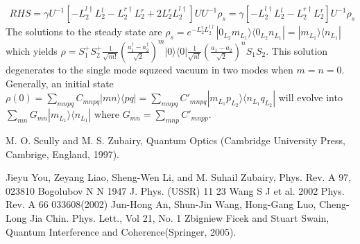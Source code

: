 \documentclass[aps,showpacs,onecolumn,twoside,groupedaddress]{revtex4}
\begin{document}
\begin{equation}
\label{eq18}
\begin{split}
RHS=\gamma U^{-1}[-L_2^{l\dagger}L_2^{l}-L_2^{r\dagger}L_2^{r}+2L_2^{r}L_2^{l\dagger}]UU^{-1}\rho_{s}=\gamma[-L_2^{l\dagger}L_2^{l}-L_2^{r\dagger}L_2^{r}]U^{-1}\rho_{s}
\end{split}
\end{equation}
The solutions to the steady state are $\rho_{s}=e^{-L_{2}^{r}L_{2}^{l\dagger}}|0_{L_{2}}m_{L_{1}}\rangle\langle0_{L_{2}}n_{L_{1}}|=|m_{L_{1}}\rangle\langle n_{L_{1}}|$ which yields $\rho=S_{1}^{+}S_{2}^{+}\frac{1}{\sqrt{m!}}(\frac{a_{1}^{\dagger}-a_{2}^{\dagger}}{\sqrt{2}})^{m}|0\rangle\langle0|\frac{1}{\sqrt{n!}}(\frac{a_{1}-a_{2}}{\sqrt{2}})^{n}S_{1}S_{2}$. This solution degenerates to the single mode squzeed vacuum in two modes when $m=n=0$. Generally, an initial state $\rho(0)=\sum_{mnpq}C_{mnpq}|mn\rangle\langle pq|=\sum_{mnpq}C'_{mnpq}|m_{L_{1}}p_{L_{2}}\rangle\langle n_{L_{1}}q_{L_{2}}|$ will evolve into $\sum_{mn}G_{mn}|m_{L_{1}}\rangle\langle n_{L_{1}}|$ where $G_{mn}=\sum_{mnp}C'_{mnpp}$.





\begin{thebibliography}{99}
 M. O. Scully and M. S. Zubairy, Quantum Optics (Cambridge University Press, Cambrige, England, 1997).

 Jieyu You, Zeyang Liao, Sheng-Wen Li, and M. Suhail Zubairy, Phys. Rev. A 97, 023810 
 Bogolubov N N 1947 J. Phys. (USSR) 11 23
 Wang S J et al. 2002 Phys. Rev. A 66 033608(2002)
 Jun-Hong An, Shun-Jin Wang, Hong-Gang Luo, Cheng-Long Jia Chin. Phys. Lett., Vol 21, No. 1
 Zbigniew Ficek and Stuart Swain, Quantum Interference
and Coherence(Springer, 2005).

\end{thebibliography} 
\end{document}
